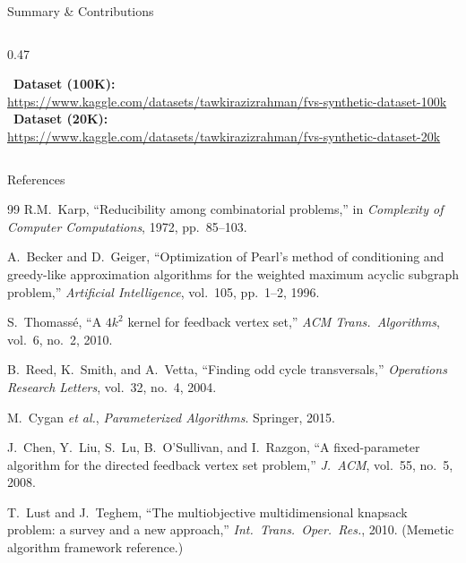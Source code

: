 \documentclass[aspectratio=169,10pt]{beamer}
\renewcommand{\footnotesize}{\tiny}
\begin{document}
\begin{frame}{Summary \& Contributions}
\begin{columns}[T]
\begin{column}{0.47\textwidth}
\begin{tcolorbox}[greenbox,fontupper=\footnotesize]
        \faDatabase~\textbf{Dataset (100K):}\\
        {\tiny\url{https://www.kaggle.com/datasets/tawkirazizrahman/fvs-synthetic-dataset-100k}}\\[2pt]
        \faDatabase~\textbf{Dataset (20K):}\\
        {\tiny\url{https://www.kaggle.com/datasets/tawkirazizrahman/fvs-synthetic-dataset-20k}}
      \end{tcolorbox}
    \end{column}
  \end{columns}
\end{frame}

\begin{frame}[allowframebreaks]{References}
  \begin{thebibliography}{99}
    \scriptsize
      R.M.~Karp,
      ``Reducibility among combinatorial problems,''
      in \emph{Complexity of Computer Computations}, 1972, pp.~85--103.

      A.~Becker and D.~Geiger,
      ``Optimization of Pearl's method of conditioning and greedy-like approximation
       algorithms for the weighted maximum acyclic subgraph problem,''
      \emph{Artificial Intelligence}, vol.~105, pp.~1--2, 1996.

      S.~Thomassé,
      ``A $4k^2$ kernel for feedback vertex set,''
      \emph{ACM Trans.\ Algorithms}, vol.~6, no.~2, 2010.

      B.~Reed, K.~Smith, and A.~Vetta,
      ``Finding odd cycle transversals,''
      \emph{Operations Research Letters}, vol.~32, no.~4, 2004.

      M.~Cygan \emph{et al.},
      \emph{Parameterized Algorithms}.
      Springer, 2015.

      J.~Chen, Y.~Liu, S.~Lu, B.~O'Sullivan, and I.~Razgon,
      ``A fixed-parameter algorithm for the directed feedback vertex set problem,''
      \emph{J.~ACM}, vol.~55, no.~5, 2008.

      T.~Lust and J.~Teghem,
      ``The multiobjective multidimensional knapsack problem: a survey and a new approach,''
      \emph{Int.\ Trans.\ Oper.\ Res.}, 2010.
      {\footnotesize(Memetic algorithm framework reference.)}


\end{thebibliography}
\end{frame}
\end{document}
